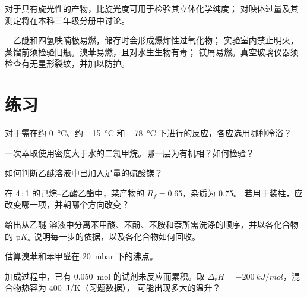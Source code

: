 对于具有旋光性的产物，比旋光度可用于检验其立体化学纯度；
对映体过量及其测定将在本科三年级分册中讨论。

\begin{safety}{\,\,\,\,}
乙醚和四氢呋喃极易燃，储存时会形成爆炸性过氧化物；
实验室内禁止明火，蒸馏前须检验旧瓶。溴苯易燃，且对水生生物有毒；
镁屑易燃。真空玻璃仪器须检查有无星形裂纹，并加以防护。
\end{safety}

\section{练习}

\begin{exercise}[$\star$]\label{exo:b2:lab-techniques-2:1}
对于需在约 \qty{0}{\degreeCelsius}、约
\qty{-15}{\degreeCelsius} 和 \qty{-78}{\degreeCelsius} 下进行的反应，各应选用哪种冷浴？
\end{exercise}

\begin{exercise}[$\star$]\label{exo:b2:lab-techniques-2:2}
一次萃取使用密度大于水的二氯甲烷。哪一层为有机相？如何检验？
\end{exercise}

\begin{exercise}[$\star$]\label{exo:b2:lab-techniques-2:3}
如何判断乙醚溶液中已加入足量的硫酸镁？
\end{exercise}

\begin{exercise}[$\star$]\label{exo:b2:lab-techniques-2:4}
在 4\,:\,1 的己烷–乙酸乙酯中，某产物的 $R_f = 0.65$，杂质为 0.75。
若用于装柱，应改变哪一项，并朝哪个方向改变？
\end{exercise}

\begin{exercise}[$\star\star$]\label{exo:b2:lab-techniques-2:5}
给出从乙醚
溶液中分离苯甲酸、苯酚、苯胺和萘所需洗涤的顺序，并以各化合物的 $\mathrm pK_a$ 说明每一步的依据，以及各化合物如何回收。
\end{exercise}

\begin{exercise}[$\star\star$]\label{exo:b2:lab-techniques-2:6}
估算溴苯和苯甲醛在 \qty{20}{mbar} 下的沸点。
\end{exercise}

\begin{exercise}[$\star\star$]\label{exo:b2:lab-techniques-2:7}
加成过程中，已有 \qty{0.050}{mol} 的试剂未反应而累积。取 $\Delta_rH =
\qty{-200}{kJ/mol}$，混合物热容为 \qty{400}{J/K}（习题数据），
可能出现多大的温升？
\end{exercise}

